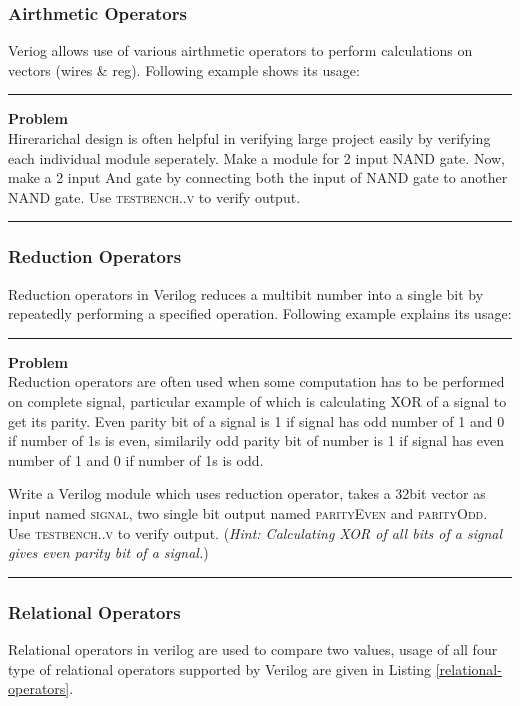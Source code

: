 \documentclass[a4paper,10pt]{article}
\newcommand{\ano}{\text{1}}
\theoremstyle{mytheor}
\newcommand{
  \insertverilog}[3]{
  
}
\newcounter{problemNumber}
\newcommand {
  \insertProblem}[1]{
  \vspace{0.5cm}
  \hrule
  \vspace{0.3cm}

  {\color{greatblue}\textbf{\large{Problem \theproblemNumber}}}
  \vspace{2pt}\\#1

  \addtocounter{problemNumber}{1}
  \vspace{0.2cm}
  \hrule  
  \vspace{0.5cm}
}
\begin{document}
\subsubsection*{Airthmetic Operators}
Veriog allows use of various airthmetic operators to perform
calculations on vectors (wires \& reg). Following example shows its
usage:
\insertverilog{./verilog_files/airthmeticOperators.v}{airthmetic-operators}{\text{Functioning of airthmetic operator}}

\insertProblem{Hirerarichal design is often helpful in verifying large project easily by verifying each individual module seperately. Make a module for 2 input NAND gate. Now, make a 2 input And gate by connecting both the input of NAND gate to another NAND gate. Use \textsc{testbench{\ano}.{\theproblemNumber}.v} to verify output.}


\subsubsection*{Reduction Operators}
Reduction operators in Verilog reduces a multibit number into a single
bit by repeatedly performing a specified operation. Following example 
explains its usage: 
\insertverilog{./verilog_files/reductionOperators.v}{reduction-operators}{\text{Functioning of reduction operator}}

\insertProblem {
  Reduction operators are often used when some computation has to be performed on complete signal, particular example of which is calculating XOR of a signal to get its parity. Even parity bit of a signal is 1 if signal has odd number of 1 and 0 if number of 1s is even, similarily odd parity bit of number is 1 if signal has even number of 1 and 0 if number of 1s is odd.

  Write a Verilog module which uses reduction operator, takes a 32bit vector as input named \textsc{signal}, two single bit output named \textsc{parityEven} and \textsc{parityOdd}. Use \textsc{testbench{\ano}.{\theproblemNumber}.v} to verify output. (\textit{Hint: Calculating XOR of all bits of a signal gives even parity bit of a signal.})
}

\subsubsection*{Relational Operators}
Relational operators in verilog are used to compare two values, usage
of all four type of relational operators supported by Verilog are
given in Listing \ref{relational-operators}.
\insertverilog{./verilog_files/relationalOperators.v}{relational-operators}{\text{Functioning of relational operator}}
  
\end{document}
